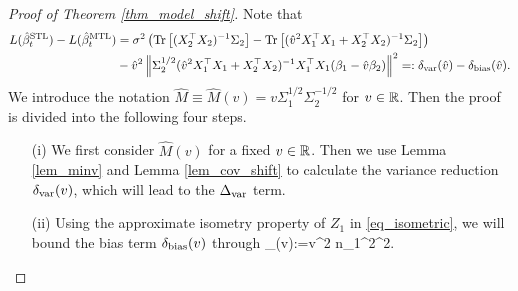 \begin{proof}[Proof of Theorem \ref{thm_model_shift}]
Note that 
\begin{align*}
L(\hat{\beta}_t^{\text{STL}}) - L(\hat{\beta}_t^{\text{MTL}}) &=\sigma^2 \left(  \operatorname{Tr}\left[(X_2^{\top}X_2)^{-1}\Sigma_2\right] -  \operatorname{Tr}\left[( \hat{v}^2 X_1^{\top}X_1 + X_2^{\top}X_2)^{-1} \Sigma_2\right]\right) \\
&- \hat{v}^2 \left\| \Sigma_2^{1/2}(\hat{v}^2 X_1^{\top}X_1 + X_2^{\top}X_2)^{-1} X_1^{\top}X_1 (\beta_1 - \hat{v} \beta_2) \right\|^2=:\delta_{\text{var}}(\hat v) - \delta_{\text{bias}}(\hat v).
\end{align*}
We introduce the notation $\hat M \equiv \hat M(v)= v\Sigma_1^{1/2}\Sigma_2^{-1/2}$ for $v\in \mathbb{R}$. Then the proof is divided into the following four steps. 
\begin{itemize}
\item[(i)] We first consider $ \hat M(v)$ for a fixed $v\in \mathbb{R}$. Then we use Lemma \ref{lem_minv} and Lemma \ref{lem_cov_shift} to calculate the variance reduction $\delta_{\text{var}}(v)$, which will lead to the $\Delta_{\text{var}}$ term.

\item[(ii)] Using the approximate isometry property of $Z_1$ in \eqref{eq_isometric}, we will bound the bias term $ \delta_{\text{bias}}(v)$
through 
\be\label{deltabetapf}
\wt\delta_{\bias}(v):={v}^2 n_1^2^2.\ee


\end{itemize}
\end{proof}

